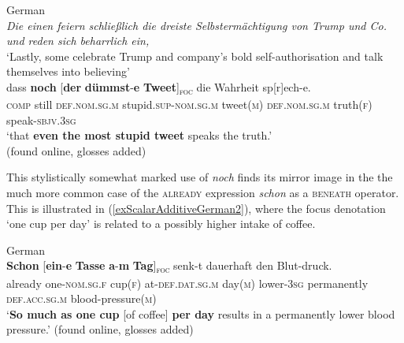 {\begin{exe}
	\ex German\label{exScalarAdditiveGerman1}\\
	\textit{Die einen feiern schließlich die dreiste Selbstermächtigung von Trump und Co. und reden sich beharrlich ein,}\\
	\lq Lastly, some celebrate Trump and company's bold self-authorisation and talk themselves into believing\rq{}\\
	\gll dass \textbf{noch} \textup{[}\textbf{der} \textbf{dümmst}-\textbf{e} \textbf{Tweet}\textup{]\textsubscript{\textsc{foc}}} die Wahrheit sp[r]ech-e.\\
\textsc{comp} still \phantom{[}\textsc{def}.\textsc{nom}.\textsc{sg}.\textsc{m} stupid.\textsc{sup}-\textsc{nom}.\textsc{sg}.\textsc{m} tweet(\textsc{m}) \textsc{def}.\textsc{nom}.\textsc{sg}.\textsc{m} truth(\textsc{f}) speak-\textsc{sbjv}.3\textsc{sg}\\
\glt \lq that \textbf{even the most stupid tweet} speaks the truth.'
\\(found online, glosses added)%
\end{exe}

This stylistically somewhat marked use of \textit{noch} finds its mirror image in the the much more common case of the \textsc{already} expression \textit{schon} as a \textsc{beneath} operator. This is illustrated in (\ref{exScalarAdditiveGerman2}), where the focus denotation \lq one cup per day\rq{ }is related to a possibly higher intake of coffee.
\enlargethispage{\baselineskip}
\begin{exe}
	\ex German\label{exScalarAdditiveGerman2}\\
	\gll \textbf{Schon} \textup{[}\textbf{ein}-\textbf{e} \textbf{Tasse} \textbf{a}-\textbf{m} \textbf{Tag}\textup{]\textsubscript{\textsc{foc}}} senk-t dauerhaft den Blut-druck.\\
	already \phantom{[}one-\textsc{nom}.\textsc{sg}.\textsc{f} cup(\textsc{f}) at-\textsc{def}.\textsc{dat}.\textsc{sg}.\textsc{m} day(\textsc{m}) \phantom{[}lower-3\textsc{sg} permanently \textsc{def}.\textsc{acc}.\textsc{sg}.\textsc{m} blood-pressure(\textsc{m})\\
	\glt \lq \textbf{So much as one cup} [of coffee] \textbf{per day} results in a permanently lower blood pressure.\rq{ }(found online, glosses added)%
\end{exe}

}
